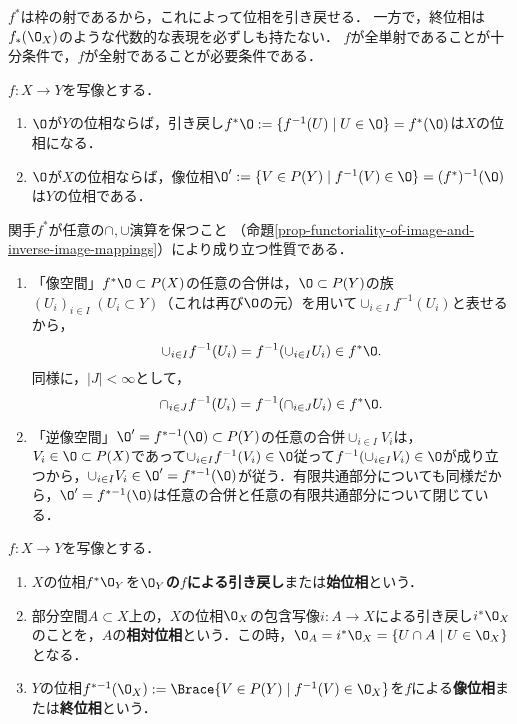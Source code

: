\documentclass[uplatex,dvipdfmx]{jsreport}
\begin{document}
\begin{tcolorbox}[colframe=ForestGreen, colback=ForestGreen!10!white,breakable,colbacktitle=ForestGreen!40!white,coltitle=black,fonttitle=\bfseries\sffamily,
title=]
    $f^*$は枠の射であるから，これによって位相を引き戻せる．
    一方で，終位相は$f_*(\O_X)$のような代数的な表現を必ずしも持たない．
    $f$が全単射であることが十分条件で，$f$が全射であることが必要条件である．
\end{tcolorbox}

\begin{proposition}[$f^*$は枠の射である]\label{prop-pullback-and-image-topology}
    $f:X\to Y$を写像とする．
    \begin{enumerate}
        \item $\O$が$Y$の位相ならば，引き戻し$f^*\O:=\{f^{-1}(U)\mid U\in\O\}=f^*(\O)$は$X$の位相になる．
        \item $\O$が$X$の位相ならば，像位相$\O':=\{V\in P(Y)\mid  f^{-1}(V)\in\O\}=(f^*)^{-1}(\O)$は$Y$の位相である．
    \end{enumerate}
\end{proposition}
\begin{Proof}
    関手$f^*$が任意の$\cap,\cup$演算を保つこと
    （命題\ref{prop-functoriality-of-image-and-inverse-image-mappings}）により成り立つ性質である．
    \begin{enumerate}
        \item 「像空間」$f^*\O\subset P(X)$の任意の合併は，$\O\subset P(Y)$の族$(U_i)_{i\in I}\;(U_i\subset Y)$（これは再び$\O$の元）を用いて$\cup_{i\in I}f^{-1}(U_i)$と表せるから，\[\cup_{i\in I}f^{-1}(U_i)=f^{-1}(\cup_{i\in I}U_i)\in f^*\O.\]同様に，$|J|<\infty$として，\[\cap_{i\in J}f^{-1}(U_i)=f^{-1}(\cap_{i\in J}U_i)\in f^*\O.\]
        \item 「逆像空間」$\O'=f^{*-1}(\O)\subset P(Y)$の任意の合併$\cup_{i\in I}V_i$は，$V_i\in\O\subset P(X)$であって$\cup_{i\in I}f^{-1}(V_i)\in \O$従って$f^{-1}(\cup_{i\in I}V_i)\in\O$が成り立つから，$\cup_{i\in I}V_i\in\O'=f^{*-1}(\O)$が従う．有限共通部分についても同様だから，$\O'=f^{*-1}(\O)$は任意の合併と任意の有限共通部分について閉じている．
    \end{enumerate}
\end{Proof}

\begin{definition}
    $f:X\to Y$を写像とする．
    \begin{enumerate}
        \item $X$の位相$f^*\O_Y$を\textbf{$\O_Y$の$f$による引き戻し}または\textbf{始位相}という．
        \item 部分空間$A\subset X$上の，$X$の位相$\O_X$の包含写像$i:A\to X$による引き戻し$i^*\O_X$のことを，$A$の\textbf{相対位相}という．この時，$\O_A=i^*\O_X=\{U\cap A\mid U\in\O_X\}$となる．
        \item $Y$の位相$f^{*-1}(\O_X):=\Brace{V\in P(Y)\mid f^{-1}(V)\in\O_X}$を$f$による\textbf{像位相}または\textbf{終位相}という．
    \end{enumerate}
\end{definition}
\end{document}
